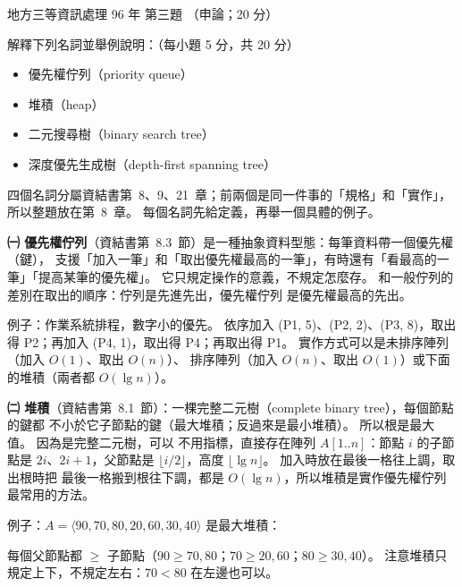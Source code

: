 \begin{pastexam}[label={px:df3-096-ds-03}]{地方三等資訊處理 96 年 第三題}
（申論；20 分）

解釋下列名詞並舉例說明：（每小題 5 分，共 20 分）
\begin{itemize}[leftmargin=2em, labelsep=0.3em, itemsep=1pt]
\item[㈠] 優先權佇列（priority queue）
\item[㈡] 堆積（heap）
\item[㈢] 二元搜尋樹（binary search tree）
\item[㈣] 深度優先生成樹（depth-first spanning tree）
\end{itemize}
\end{pastexam}

\begin{pastsoln}
四個名詞分屬資結書第~8、9、21~章；前兩個是同一件事的「規格」和「實作」，所以整題放在第~8~章。
每個名詞先給定義，再舉一個具體的例子。

\textbf{㈠ 優先權佇列}（資結書第~8.3~節）是一種抽象資料型態：每筆資料帶一個優先權（鍵），
支援「加入一筆」和「取出優先權最高的一筆」，有時還有「看最高的一筆」「提高某筆的優先權」。
它只規定操作的意義，不規定怎麼存。 和一般佇列的差別在取出的順序：佇列是先進先出，優先權佇列
是優先權最高的先出。

例子：作業系統排程，數字小的優先。 依序加入 (P1, 5)、(P2, 2)、(P3, 8)，取出得 P2；再加入
(P4, 1)，取出得 P4；再取出得 P1。 實作方式可以是未排序陣列（加入 $O(1)$、取出 $O(n)$）、
排序陣列（加入 $O(n)$、取出 $O(1)$）或下面的堆積（兩者都 $O(\lg n)$）。

\textbf{㈡ 堆積}（資結書第~8.1~節）：一棵完整二元樹（complete binary tree），每個節點的鍵都
不小於它子節點的鍵（最大堆積；反過來是最小堆積）。 所以根是最大值。 因為是完整二元樹，可以
不用指標，直接存在陣列 $A[1..n]$：節點 $i$ 的子節點是 $2i$、$2i+1$，父節點是
$\lfloor i/2 \rfloor$，高度 $\lfloor \lg n \rfloor$。 加入時放在最後一格往上調，取出根時把
最後一格搬到根往下調，都是 $O(\lg n)$，所以堆積是實作優先權佇列最常用的方法。

例子：$A = \langle 90, 70, 80, 20, 60, 30, 40 \rangle$ 是最大堆積：
\begin{center}
\end{center}
每個父節點都 $\ge$ 子節點（$90 \ge 70, 80$；$70 \ge 20, 60$；$80 \ge 30, 40$）。 注意堆積只
規定上下，不規定左右：$70 < 80$ 在左邊也可以。


\end{pastsoln}

